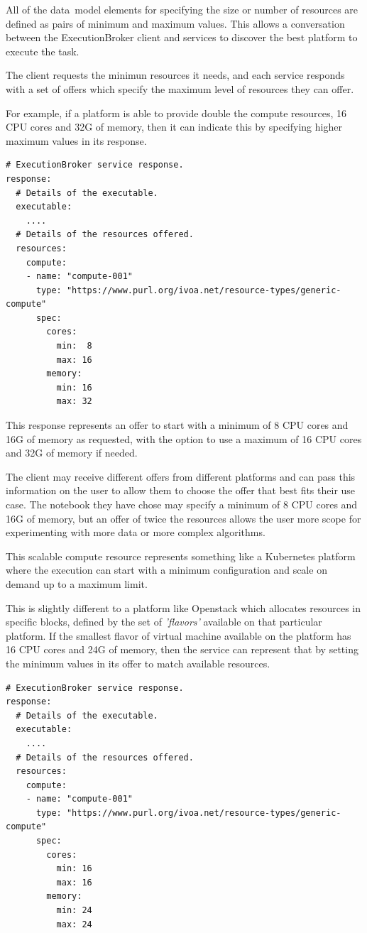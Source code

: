 \documentclass[11pt,a4paper]{ivoa}
\newcommand{\datamodel} {data~model}
\newcommand{\execbrokerclass} {ExecutionBroker}
\newcommand{\openstack} {Openstack}
\newcommand{\kubernetes} {Kubernetes}
\newcommand{\cpu}[1] {CPU#1}
\newcommand{\scalable} {scalable}
\begin{document}
All of the \datamodel{} elements for specifying the size or number of resources are defined
as pairs of minimum and maximum values.
This allows a conversation between the \execbrokerclass{} client and services
to discover the best platform to execute the task.

The client requests the minimun resources it needs,
and each service responds with a set of offers which specify the maximum
level of resources they can offer.

For example, if a platform is able to provide double the compute resources,
16 \cpu{} cores and 32G of memory,
then it can indicate this by specifying higher maximum values in its response.

\begin{lstlisting}[]
# ExecutionBroker service response.
response:
  # Details of the executable.
  executable:
    ....
  # Details of the resources offered.
  resources:
    compute:
    - name: "compute-001"
      type: "https://www.purl.org/ivoa.net/resource-types/generic-compute"
      spec:
        cores:
          min:  8
          max: 16
        memory:
          min: 16
          max: 32
\end{lstlisting}

This response represents an offer to start with a minimum of 8 \cpu{} cores and 16G of memory
as requested, with the option to use a maximum of 16 \cpu{} cores and 32G of memory if needed.

The client may receive different offers from different platforms and can pass this information
on the user to allow them to choose the offer that best fits their use case.
The notebook they have chose may specify a minimum of 8 \cpu{} cores and 16G of memory,
but an offer of twice the resources allows the user more scope for experimenting with
more data or more complex algorithms.

This \scalable{} compute resource represents something like a \kubernetes{} platform where the
execution can start with a minimum configuration and scale on demand up to a maximum limit.

This is slightly different to a platform like \openstack{} which allocates resources
in specific blocks, defined by the set of \textit{'flavors'} available on that particular platform.
If the smallest flavor of virtual machine available on the platform has 16 \cpu{} cores and 24G of memory,
then the service can represent that by setting the minimum values in its offer to match available resources.

\begin{lstlisting}[]
# ExecutionBroker service response.
response:
  # Details of the executable.
  executable:
    ....
  # Details of the resources offered.
  resources:
    compute:
    - name: "compute-001"
      type: "https://www.purl.org/ivoa.net/resource-types/generic-compute"
      spec:
        cores:
          min: 16
          max: 16
        memory:
          min: 24
          max: 24
\end{lstlisting}
\end{document}
